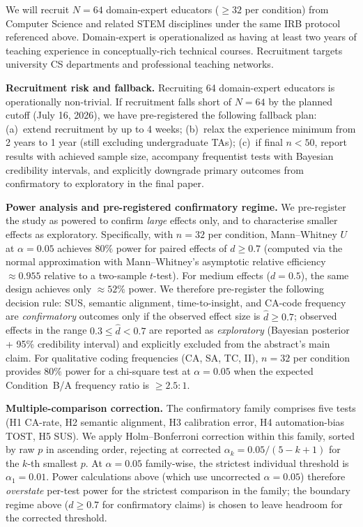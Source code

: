 \documentclass[journal,review]{vgtc}
\begin{document}
We will recruit $N = 64$ domain-expert educators ($\geq 32$ per condition) from Computer Science and related STEM disciplines under the same IRB protocol referenced above. Domain-expert is operationalized as having at least two years of teaching experience in conceptually-rich technical courses. Recruitment targets university CS departments and professional teaching networks.

\textbf{Recruitment risk and fallback.} Recruiting 64 domain-expert educators is operationally non-trivial. If recruitment falls short of $N=64$ by the planned cutoff (July 16, 2026), we have pre-registered the following fallback plan: (a)~extend recruitment by up to 4 weeks; (b)~relax the experience minimum from 2 years to 1 year (still excluding undergraduate TAs); (c)~if final $n < 50$, report results with achieved sample size, accompany frequentist tests with Bayesian credibility intervals, and explicitly downgrade primary outcomes from confirmatory to exploratory in the final paper.

\textbf{Power analysis and pre-registered confirmatory regime.} We pre-register
the study as powered to confirm \emph{large} effects only, and to characterise
smaller effects as exploratory. Specifically, with $n = 32$ per condition,
Mann--Whitney $U$ at $\alpha = 0.05$ achieves $80\%$ power for paired effects of
$d \geq 0.7$ (computed via the normal approximation with Mann--Whitney's
asymptotic relative efficiency $\approx 0.955$ relative to a two-sample
$t$-test). For medium effects ($d = 0.5$), the same design achieves only
$\approx 52\%$ power. We therefore pre-register the following decision rule:
SUS, semantic alignment, time-to-insight, and CA-code frequency are
\emph{confirmatory} outcomes only if the observed effect size is
$\hat{d} \geq 0.7$; observed effects in the range $0.3 \leq \hat{d} < 0.7$ are
reported as \emph{exploratory} (Bayesian posterior + 95\% credibility interval)
and explicitly excluded from the abstract's main claim. For qualitative coding
frequencies (CA, SA, TC, II), $n = 32$ per condition provides $80\%$ power
for a chi-square test at $\alpha = 0.05$ when the expected Condition~B/A
frequency ratio is $\geq 2.5{:}1$.

\textbf{Multiple-comparison correction.} The confirmatory family comprises
five tests (H1 CA-rate, H2 semantic alignment, H3 calibration error, H4
automation-bias TOST, H5 SUS). We apply Holm--Bonferroni correction within
this family, sorted by raw $p$ in ascending order, rejecting at corrected
$\alpha_k = 0.05 / (5 - k + 1)$ for the $k$-th smallest $p$. At $\alpha = 0.05$
family-wise, the strictest individual threshold is $\alpha_1 = 0.01$. Power
calculations above (which use uncorrected $\alpha = 0.05$) therefore
\emph{overstate} per-test power for the strictest comparison in the family;
the boundary regime above ($d \geq 0.7$ for confirmatory claims) is chosen
to leave headroom for the corrected threshold.
\end{document}
